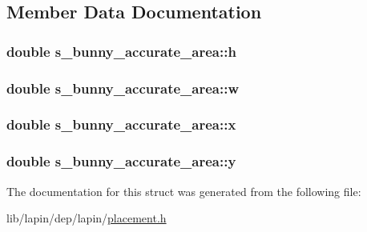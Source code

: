 \subsection{Member Data Documentation}
\hypertarget{structs__bunny__accurate__area_a71fb55ce904abe4005b325c3b677b723}{
\subsubsection[{h}]{\setlength{\rightskip}{0pt plus 5cm}double s\-\_\-bunny\-\_\-accurate\-\_\-area\-::h}}\label{structs__bunny__accurate__area_a71fb55ce904abe4005b325c3b677b723}
\hypertarget{structs__bunny__accurate__area_abc4cf7771d77df2caf9dcfb20fa06071}{
\subsubsection[{w}]{\setlength{\rightskip}{0pt plus 5cm}double s\-\_\-bunny\-\_\-accurate\-\_\-area\-::w}}\label{structs__bunny__accurate__area_abc4cf7771d77df2caf9dcfb20fa06071}
\hypertarget{structs__bunny__accurate__area_a7d18c18334113b0d3dfe4f3ee75025a8}{
\subsubsection[{x}]{\setlength{\rightskip}{0pt plus 5cm}double s\-\_\-bunny\-\_\-accurate\-\_\-area\-::x}}\label{structs__bunny__accurate__area_a7d18c18334113b0d3dfe4f3ee75025a8}
\hypertarget{structs__bunny__accurate__area_a376f9c6f1e74b2a88d8866b8b07e47dc}{
\subsubsection[{y}]{\setlength{\rightskip}{0pt plus 5cm}double s\-\_\-bunny\-\_\-accurate\-\_\-area\-::y}}\label{structs__bunny__accurate__area_a376f9c6f1e74b2a88d8866b8b07e47dc}


The documentation for this struct was generated from the following file\-:\begin{DoxyCompactItemize}
\item 
lib/lapin/dep/lapin/\hyperlink{placement_8h}{placement.\-h}\end{DoxyCompactItemize}
